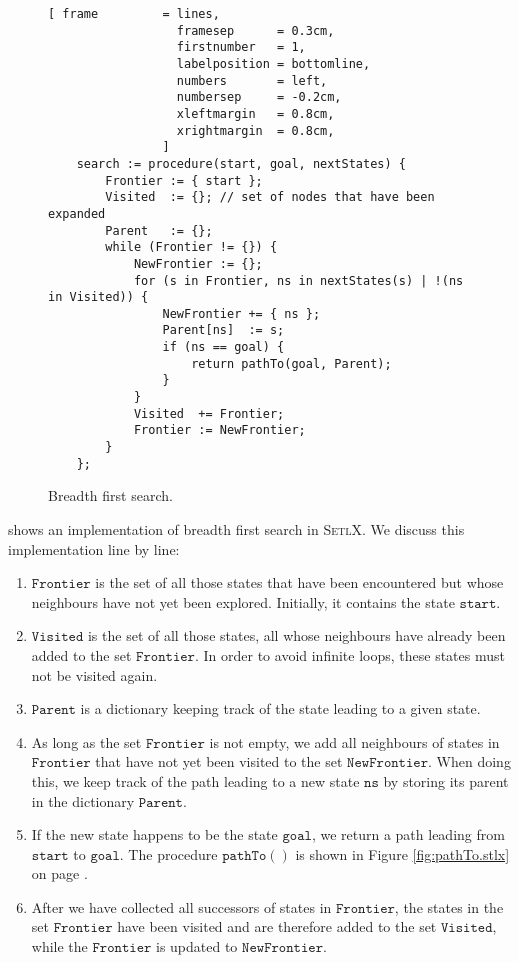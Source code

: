 \begin{figure}[!ht]
\centering
\begin{Verbatim}[ frame         = lines, 
                  framesep      = 0.3cm, 
                  firstnumber   = 1,
                  labelposition = bottomline,
                  numbers       = left,
                  numbersep     = -0.2cm,
                  xleftmargin   = 0.8cm,
                  xrightmargin  = 0.8cm,
                ]
    search := procedure(start, goal, nextStates) {
        Frontier := { start };
        Visited  := {}; // set of nodes that have been expanded
        Parent   := {};
        while (Frontier != {}) {
            NewFrontier := {};
            for (s in Frontier, ns in nextStates(s) | !(ns in Visited)) {
                NewFrontier += { ns };
                Parent[ns]  := s;
                if (ns == goal) {
                    return pathTo(goal, Parent);
                }
            }
            Visited  += Frontier;
            Frontier := NewFrontier;
        }
    };
\end{Verbatim}
\vspace*{-0.3cm}
\caption{Breadth first search.}
\label{fig:breadth-first-search.stlx}
\end{figure}
 shows an implementation of
breadth first search in \textsc{SetlX}.  We discuss this implementation line by line:
\begin{enumerate}
\item $\mathtt{Frontier}$ is the set of all those states that have been encountered but whose
      neighbours have not yet been explored.  Initially, it contains the state $\mathtt{start}$.
\item $\mathtt{Visited}$ is the set of all those states, all whose neighbours have already been
      added to the set $\mathtt{Frontier}$.  In order to avoid infinite loops, these states must not
      be visited again.
\item $\mathtt{Parent}$ is a dictionary keeping track of the state leading to a given state.
\item As long as the set $\mathtt{Frontier}$ is not empty, we add all neighbours of states in 
      $\mathtt{Frontier}$ that have not yet been visited to the set $\mathtt{NewFrontier}$.
      When doing this, we keep track of the path leading to a new state $\mathtt{ns}$ by storing its
      parent in the dictionary $\mathtt{Parent}$.
\item If the new state happens to be the state $\mathtt{goal}$, we return a path leading from
      $\mathtt{start}$ to $\mathtt{goal}$.  The procedure $\mathtt{pathTo}()$ is shown in Figure
      \ref{fig:pathTo.stlx} on page \pageref{fig:pathTo.stlx}.
\item After we have collected all successors of states in $\mathtt{Frontier}$, the states
      in the set $\mathtt{Frontier}$ have been visited and are therefore added to the set
      $\mathtt{Visited}$, while the $\mathtt{Frontier}$ is updated to $\mathtt{NewFrontier}$.
\end{enumerate}

